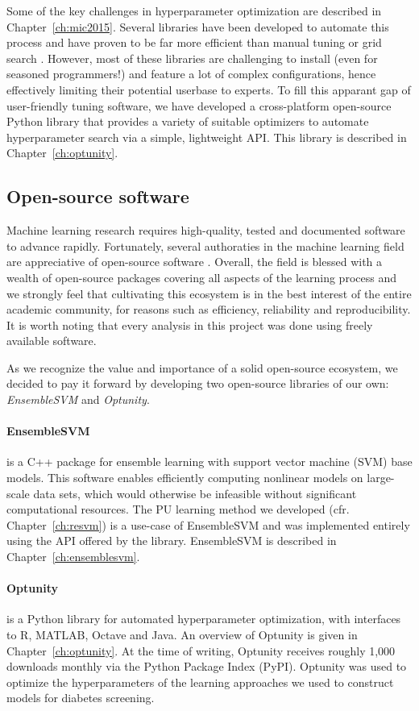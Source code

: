 Some of the key challenges in hyperparameter optimization are described in Chapter~\ref{ch:mic2015}. Several libraries have been developed to automate this process and have proven to be far more efficient than manual tuning or grid search \citep{hutter2009paramils, bergstra2012random, snoek2012practical, bergstra2013hyperopt}. However, most of these libraries are challenging to install (even for seasoned programmers!) and feature a lot of complex configurations, hence effectively limiting their potential userbase to experts. To fill this apparant gap of user-friendly tuning software, we have developed a cross-platform open-source Python library that provides a variety of suitable optimizers to automate hyperparameter search via a simple, lightweight API. This library is described in Chapter~\ref{ch:optunity}.


\subsection{Open-source software} \label{intro:software}
Machine learning research requires high-quality, tested and documented software to advance rapidly. Fortunately, several authoraties in the machine learning field are appreciative of open-source software \citep{sonnenburg2007need}. Overall, the field is blessed with a wealth of open-source packages covering all aspects of the learning process and we strongly feel that cultivating this ecosystem is in the best interest of the entire academic community, for reasons such as efficiency, reliability and reproducibility. It is worth noting that every analysis in this project was done using freely available software.

As we recognize the value and importance of a solid open-source ecosystem, we decided to pay it forward by developing two open-source libraries of our own: \emph{EnsembleSVM} and \emph{Optunity}.

\paragraph{EnsembleSVM} is a C++ package for ensemble learning with support vector machine (SVM) base models. This software enables efficiently computing nonlinear models on large-scale data sets, which would otherwise be infeasible without significant computational resources. The PU learning method we developed (cfr. Chapter~\ref{ch:resvm}) is a use-case of EnsembleSVM and was implemented entirely using the API offered by the library. EnsembleSVM is described in Chapter~\ref{ch:ensemblesvm}.

\paragraph{Optunity} is a Python library for automated hyperparameter optimization, with interfaces to R, MATLAB, Octave and Java. An overview of Optunity is given in Chapter~\ref{ch:optunity}. At the time of writing, Optunity receives roughly 1,000 downloads monthly via the Python Package Index (PyPI). Optunity was used to optimize the hyperparameters of the learning approaches we used to construct models for diabetes screening.
